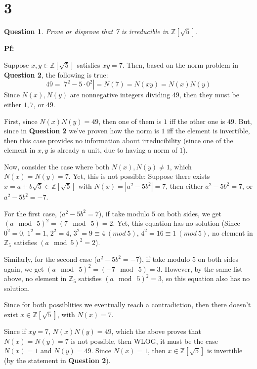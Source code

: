 \documentclass{article}
\newtheorem{question}{Question}
\begin{document}
\break

\section*{3}
\begin{myBox}[]{}
    \begin{question}
        Prove or disprove that 7 is irreducible in $\mathbb{Z}[\sqrt{5}]$.
    \end{question}
\end{myBox}

\textbf{Pf:}

Suppose $x,y\in\mathbb{Z}[\sqrt{5}]$ satisfies $xy=7$. Then, based on the norm problem in \textbf{Question 2},
the following is true:
$$49 = |7^2-5\cdot 0^2| = N(7) = N(xy) = N(x)N(y)$$
Since $N(x),N(y)$ are nonnegative integers dividing $49$, then they must be either $1,7$, or $49$.

\hfil

First, since $N(x)N(y)=49$, then one of them is $1$ iff the other one is $49$. But, since in \textbf{Question 2} we've proven how the norm is $1$ iff the element is invertible,
then this case provides no information about irreducibility (since one of the element in $x,y$ is already a unit, due to having a norm of $1$).

\hfil

Now, consider the case where both $N(x),N(y)\neq 1$, which $N(x)=N(y)=7$. Yet, this is not possible:
Suppose there exists $x=a+b\sqrt{5}\in\mathbb{Z}[\sqrt{5}]$ with $N(x)=|a^2-5b^2|=7$, then either $a^2-5b^2=7$, or $a^2-5b^2=-7$.

For the first case, ($a^2-5b^2=7$), if take modulo $5$ on both sides, we get $(a\mod\ 5)^2=(7\mod\ 5)=2$. Yet, this equation has no solution
(Since $0^2=0$, $1^2=1$, $2^2=4$, $3^2=9\equiv 4\ (mod\ 5)$, $4^2=16\equiv 1\ (mod\ 5)$, no element in $\mathbb{Z}_5$ satisfies $(a\mod 5)^2=2$).

Similarly, for the second case ($a^2-5b^2=-7$), if take modulo $5$ on both sides again, we get $(a\mod\ 5)^2=(-7\mod\ 5)=3$. However, by the same list above,
no element in $\mathbb{Z}_5$ satisfies $(a\mod\ 5)^2=3$, so this equation also has no solution.

Since for both possiblities we eventually reach a contradiction, then there doesn't exist $x\in\mathbb{Z}[\sqrt{5}]$, with $N(x)=7$.

\hfil

Since if $xy=7$, $N(x)N(y)=49$, which the above proves that $N(x)=N(y)=7$ is not possible, then WLOG, it must be the case $N(x)=1$ and $N(y)=49$.
Since $N(x)=1$, then $x\in\mathbb{Z}[\sqrt{5}]$ is invertible (by the statement in \textbf{Question 2}).
\end{document}
